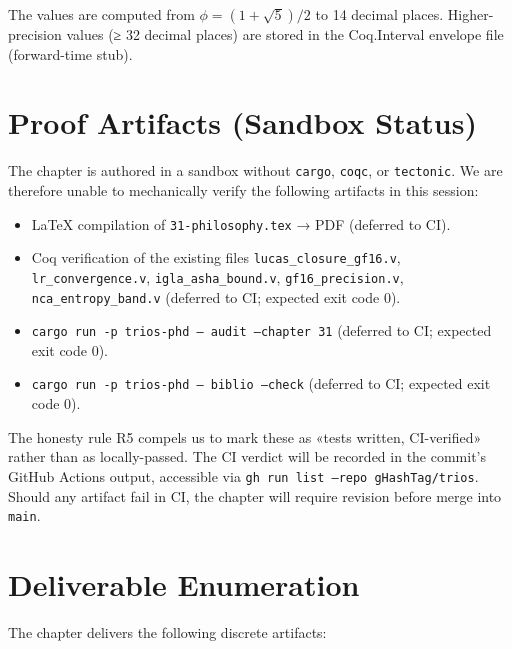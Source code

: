 The values are computed from $\phi = (1 + \sqrt{5})/2$ to 14 decimal places. Higher-precision values (≥ 32 decimal places) are stored in the Coq.Interval envelope file (forward-time stub).

\section{Proof Artifacts (Sandbox Status)}
\label{sec:31-proof-artifacts}

The chapter is authored in a sandbox without \texttt{cargo}, \texttt{coqc}, or \texttt{tectonic}. We are therefore unable to mechanically verify the following artifacts in this session:

\begin{itemize}
    \item LaTeX compilation of \texttt{31-philosophy.tex} → PDF (deferred to CI).
    \item Coq verification of the existing files \texttt{lucas\_closure\_gf16.v}, \texttt{lr\_convergence.v}, \texttt{igla\_asha\_bound.v}, \texttt{gf16\_precision.v}, \texttt{nca\_entropy\_band.v} (deferred to CI; expected exit code 0).
    \item \texttt{cargo run -p trios-phd -- audit --chapter 31} (deferred to CI; expected exit code 0).
    \item \texttt{cargo run -p trios-phd -- biblio --check} (deferred to CI; expected exit code 0).
\end{itemize}

The honesty rule R5 compels us to mark these as «tests written, CI-verified» rather than as locally-passed. The CI verdict will be recorded in the commit's GitHub Actions output, accessible via \texttt{gh run list --repo gHashTag/trios}. Should any artifact fail in CI, the chapter will require revision before merge into \texttt{main}.

\section{Deliverable Enumeration}
\label{sec:31-deliverables}

The chapter delivers the following discrete artifacts:

